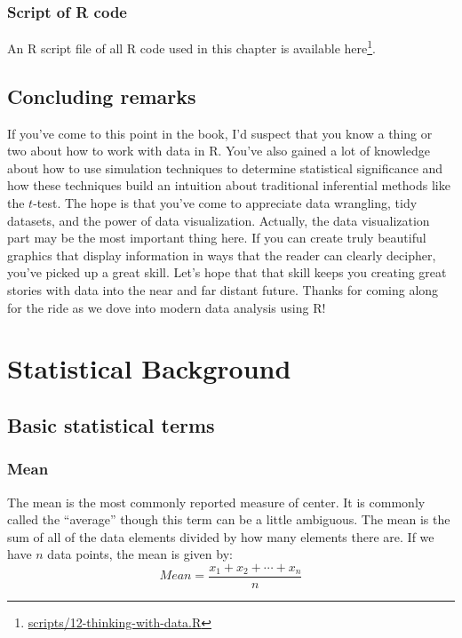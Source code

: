 \documentclass[12pt,]{krantz}
\renewcommand{\href}[2]{#2\footnote{\url{#1}}}
\begin{document}
\subsection{Script of R code}\label{script-of-r-code-9}

An R script file of all R code used in this chapter is available
\href{scripts/12-thinking-with-data.R}{here}.

\section*{Concluding remarks}\label{concluding-remarks}


If you've come to this point in the book, I'd suspect that you know a
thing or two about how to work with data in R. You've also gained a lot
of knowledge about how to use simulation techniques to determine
statistical significance and how these techniques build an intuition
about traditional inferential methods like the \(t\)-test. The hope is
that you've come to appreciate data wrangling, tidy datasets, and the
power of data visualization. Actually, the data visualization part may
be the most important thing here. If you can create truly beautiful
graphics that display information in ways that the reader can clearly
decipher, you've picked up a great skill. Let's hope that that skill
keeps you creating great stories with data into the near and far distant
future. Thanks for coming along for the ride as we dove into modern data
analysis using R!

\cleardoublepage

\appendix {}


\chapter{Statistical Background}\label{appendixA}

\section{Basic statistical terms}\label{basic-statistical-terms}

\subsection{Mean}\label{mean}

The mean is the most commonly reported measure of center. It is commonly
called the ``average'' though this term can be a little ambiguous. The
mean is the sum of all of the data elements divided by how many elements
there are. If we have \(n\) data points, the mean is given by:
\[Mean = \frac{x_1 + x_2 + \cdots + x_n}{n}\]
\end{document}
